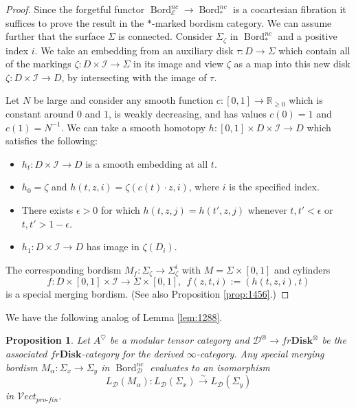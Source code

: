 \documentclass[reqno]{amsart}
\newtheorem{proposition}[lemma]{Proposition}
\theoremstyle{definition}
\newcommand{\mcl}[1]{\mathcal{#1}}
\newcommand{\msc}[1]{\mathscr{#1}}
\newcommand{\ot}{\otimes}
\newcommand{\Vect}{\msc{V}\!ect}
\newcommand{\Disk}{\mathbf{Disk}}
\newcommand{\pf}{pro\text{-}fin}
\DeclareMathOperator{\Bord}{Bord}
\renewcommand{\1}{\mathbf{1}}
\begin{document}
\begin{proof}
Since the forgetful functor $\Bord_{\msc{E}}^{nc}\to \Bord_{\ast}^{nc}$ is a cocartesian fibration it suffices to prove the result in the $\ast$-marked bordism category.  We can assume further that the surface $\Sigma$ is connected. Consider $\Sigma_{\zeta}$ in $\Bord_{\ast}^{nc}$ and a positive index $i$. We take an embedding from an auxiliary disk $\tau:D\to \Sigma$ which contain all of the markings $\zeta:D\times\mcl{I}\to \Sigma$ in its image and view $\zeta$ as a map into this new disk $\zeta:D\times\mcl{I}\to D$, by intersecting with the image of $\tau$.

Let $N$ be large and consider any smooth function $c:[0,1]\to \mathbb{R}_{\geq 0}$ which is constant around $0$ and $1$, is weakly decreasing, and has values $c(0)=1$ and $c(1)=N^{-1}$.  We can take a smooth homotopy $h:[0,1]\times D\times \mcl{I}\to D$ which satisfies the following:
\begin{itemize}
\item[(a)] $h_t:D\times\mcl{I}\to D$ is a smooth embedding at all $t$.\vspace{1mm}
\item[(a)] $h_0=\zeta$ and $h(t,z,i)=\zeta(c(t)\cdot z,i)$, where $i$ is the specified index.\vspace{1mm}
\item[(b)] There exists $\epsilon>0$ for which $h(t,z,j)=h(t',z,j)$ whenever $t,t'<\epsilon$ or $t,t'>1-\epsilon$.\vspace{1mm}
\item[(c)] $h_1:D\times\mcl{I}\to D$ has image in $\zeta(D_i)$.
\end{itemize}
The corresponding bordism $M_f:\Sigma_{\zeta}\to \Sigma^i_{\zeta}$ with $M=\Sigma\times [0,1]$ and cylinders
\[
f:D\times[0,1]\times \mcl{I}\to \Sigma\times [0,1],\ \ f(z,t,i):=(h(t,z,i),t)
\]
is a special merging bordism.  (See also Proposition \ref{prop:1456}.)
\end{proof}

We have the following  analog of Lemma \ref{lem:1288}.

\begin{proposition}\label{prop:der_merge}
Let $A^{\heartsuit}$ be a modular tensor category and $\msc{D}^{\ot}\to fr\Disk^{\ot}$ be the associated $fr\Disk$-category for the derived $\infty$-category.  Any special merging bordism $M_{\alpha}:\Sigma_x\to \Sigma_y$ in $\Bord_{\msc{D}}^{nc}$ evaluates to an isomorphism
\[
L_{\msc{D}}(M_{\alpha}):L_{\msc{D}}(\Sigma_x)\overset{\sim}\to L_{\msc{D}}(\Sigma_y)
\]
in $\Vect_{\pf}$.
\end{proposition}
\end{document}
